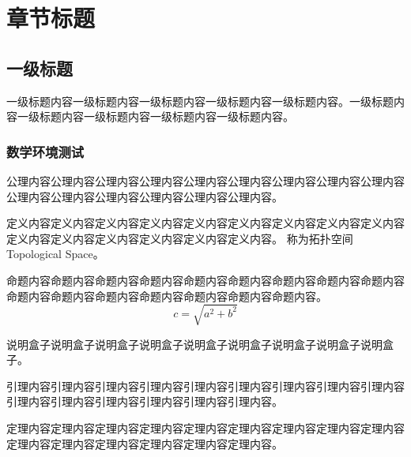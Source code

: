 \chapter{章节标题}

\section{一级标题}

一级标题内容一级标题内容一级标题内容一级标题内容一级标题内容。一级标题内容一级标题内容一级标题内容一级标题内容一级标题内容。

\subsection{数学环境测试}
\label{subsec:1.1.1}

\begin{axiom}[公理环境测试]
    公理内容公理内容公理内容公理内容公理内容公理内容公理内容公理内容公理内容公理内容公理内容公理内容公理内容公理内容公理内容。
    \label{axiom:test}
\end{axiom}

\begin{definition}[拓扑空间]
    定义内容定义内容定义内容定义内容定义内容定义内容定义内容定义内容定义内容定义内容定义内容定义内容定义内容定义内容定义内容。
    称为拓扑空间 Topological Space。
    \label{def:test}
\end{definition}

\begin{proposition}[命题环境测试]
    命题内容命题内容命题内容命题内容命题内容命题内容命题内容命题内容命题内容命题内容命题内容命题内容命题内容命题内容命题内容命题内容。
    \begin{equation}
        c = \sqrt{a^2 + b^2}
        \label{eq:test}
    \end{equation}
    \label{prop:test}
\end{proposition}

\begin{important}
    说明盒子说明盒子说明盒子说明盒子说明盒子说明盒子说明盒子说明盒子说明盒子。
\end{important}

\begin{lemma}[引理环境测试]
    引理内容引理内容引理内容引理内容引理内容引理内容引理内容引理内容引理内容引理内容引理内容引理内容引理内容引理内容引理内容。
    \label{lem:test}
\end{lemma}

\begin{theorem}[定理环境测试]
    定理内容定理内容定理内容定理内容定理内容定理内容定理内容定理内容定理内容定理内容定理内容定理内容定理内容定理内容定理内容。
    \label{thm:test}
\end{theorem}

